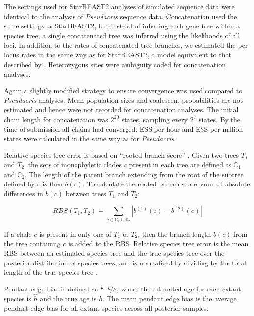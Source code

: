 \documentclass[nogrid]{MBE}%
\begin{document}
The settings used for StarBEAST2 analyses of simulated sequence data were
identical to the analysis of \textit{Pseudacris} sequence data. Concatenation
used the same settings as StarBEAST2, but instead of inferring each gene tree
within a species tree, a single concatenated tree was inferred using the
likelihoods of all loci. In addition to the rates of concatenated tree branches,
we estimated the per-locus rates in the same way as for StarBEAST2, a model
equivalent to that described by \cite{Rasmussen01122007}. Heterozygous sites
were ambiguity coded for concatenation analyses.

Again a slightly modified strategy to ensure convergence was used compared to
\textit{Pseudacris} analyses. Mean population sizes and coalescent probabilities
are not estimated and hence were not recorded for concatenation analyses. The
initial chain length for concatenation was $2^{20}$ states, sampling every
$2^{7}$ states. By the time of submission all chains had converged. ESS per hour
and ESS per million states were calculated in the same way as for
\textit{Pseudacris}.

Relative species tree error is based on ``rooted branch score''
\citep[RBS;][]{Heled2013}. Given two trees $T_1$ and $T_2$, the sets of
monophyletic clades $c$ present in each tree are defined as $\mathbb{C}_1$ and
$\mathbb{C}_2$. The length of the parent branch extending from the root of the
subtree defined by $c$ is then $b(c)$. To calculate the rooted branch score, sum
all absolute differences in $b(c)$ between trees $T_1$ and $T_2$:

\begin{equation}
RBS(T_1, T_2) = \sum_{c \in {\mathbb{C}_1} \cup {\mathbb{C}_2}} |b^{(1)}(c) - b^{(2)}(c)|
\end{equation}

If a clade $c$ is present in only one of $T_1$ or $T_2$, then the branch length
$b(c)$ from the tree containing $c$ is added to the RBS. Relative species tree
error is the mean RBS between an estimated species tree and the true
species tree over the posterior distribution of species trees, and is normalized
by dividing by the total length of the true species tree
\citep{Ogilvie01052016}.

Pendant edge bias is defined as $\nicefrac{\hat{h} - h}{h}$, where the estimated
age for each extant species is $\hat{h}$ and the true age is $h$. The mean
pendant edge bias is the average pendant edge bias for all extant species across
all posterior samples.
\end{document}
